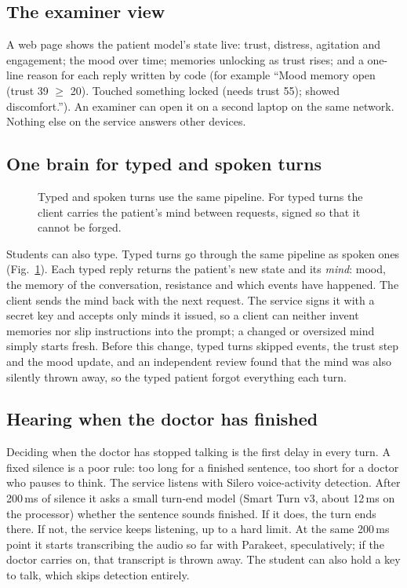 \documentclass{article}
\begin{document}
\subsection{The examiner view}
A web page shows the patient model's state live: trust, distress, agitation and engagement; the mood over time; memories unlocking as trust
rises; and a one-line reason for each reply written by code (for example ``Mood memory open (trust 39 $\ge$ 20). Touched something locked (needs
trust 55); showed discomfort.''). An examiner can open it on a second laptop on the same network. Nothing else on the service answers other
devices.

\subsection{One brain for typed and spoken turns}\label{sec:paths}

\begin{figure}[t]
\caption{Typed and spoken turns use the same pipeline. For typed turns the client carries the patient's mind between requests, signed so that
it cannot be forged.}
\label{fig:paths}
\end{figure}

Students can also type. Typed turns go through the same pipeline as spoken ones (Fig.~\ref{fig:paths}). Each typed reply returns the patient's new
state and its \emph{mind}: mood, the memory of the conversation, resistance and which events have happened. The client sends the mind back with
the next request. The service signs it with a secret key and accepts only minds it issued, so a client can neither invent memories nor slip
instructions into the prompt; a changed or oversized mind simply starts fresh. Before this change, typed turns skipped events, the trust step and
the mood update, and an independent review found that the mind was also silently thrown away, so the typed patient forgot everything each turn.

\subsection{Hearing when the doctor has finished}
Deciding when the doctor has stopped talking is the first delay in every turn. A fixed silence is a poor rule: too long for a finished sentence,
too short for a doctor who pauses to think. The service listens with Silero voice-activity detection. After 200\,ms of silence it asks a small turn-end model (Smart Turn v3, about 12\,ms on the processor) whether the sentence sounds finished. If it does, the turn ends there. If not, the service keeps listening, up to a hard limit. At the same 200\,ms point it starts transcribing the audio so far with Parakeet, speculatively; if the
doctor carries on, that transcript is thrown away. The student can also hold a key to talk, which skips detection entirely.
\end{document}
